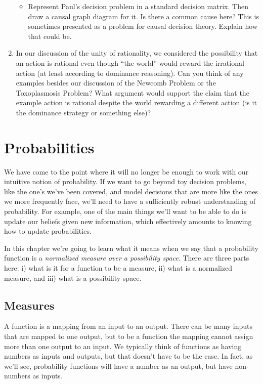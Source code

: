 \documentclass[]{tufte-book}
\providecommand{\tightlist}{%
  \setlength{\itemsep}{0pt}\setlength{\parskip}{0pt}}
\begin{document}
\begin{enumerate}
  \begin{itemize}
  \tightlist
  \item
    Represent Paul's decision problem in a standard decision matrix. Then draw a causal graph diagram for it. Is there a common cause here? This is sometimes presented as a problem for causal decision theory. Explain how that could be.
  \end{itemize}
\item
  In our discussion of the unity of rationality, we considered the possibility that an action is rational even though ``the world'' would reward the irrational action (at least according to dominance reasoning). Can you think of any examples besides our discussion of the Newcomb Problem or the Toxoplasmosis Problem? What argument would support the claim that the example action is rational despite the world rewarding a different action (is it the dominance strategy or something else)?
\end{enumerate}

\hypertarget{probabilities}{%
\chapter{Probabilities}\label{probabilities}}

We have come to the point where it will no longer be enough to work with our intuitive notion of probability. If we want to go beyond toy decision problems, like the one's we've been covered, and model decisions that are more like the ones we more frequently face, we'll need to have a sufficiently robust understanding of probability. For example, one of the main things we'll want to be able to do is update our beliefs given new information, which effectively amounts to knowing how to update probabilities.

In this chapter we're going to learn what it means when we say that a probability function is a \emph{normalized measure over a possibility space}. There are three parts here: i) what is it for a function to be a measure, ii) what is a normalized measure, and iii) what is a possibility space.

\hypertarget{measures}{%
\section{Measures}\label{measures}}

A function is a mapping from an input to an output. There can be many inputs that are mapped to one output, but to be a function the mapping cannot assign more than one output to an input. We typically think of functions as having numbers as inputs and outputs, but that doesn't have to be the case. In fact, as we'll see, probability functions will have a number as an output, but have non-numbers as inputs.
\end{document}
